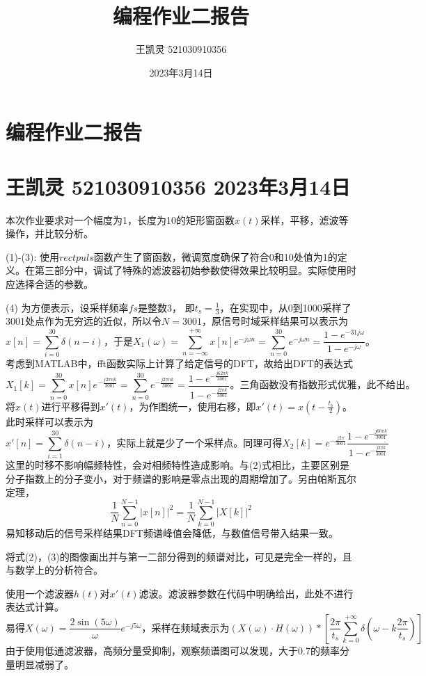 \documentclass[a4paper]{article}
\title{编程作业二报告}
\author{王凯灵 521030910356}
\date{2023年3月14日}
\begin{document}
	\section*{\Huge 编程作业二报告}
	\section*{\small 王凯灵 521030910356 2023年3月14日}
	本次作业要求对一个幅度为1，长度为10的矩形窗函数$x(t)$采样，平移，滤波等操作，并比较分析。
	
	(1)-(3): 使用$rectpuls$函数产生了窗函数，微调宽度确保了符合0和10处值为1的定义。在第三部分中，调试了特殊的滤波器初始参数使得效果比较明显。实际使用时应选择合适的参数。
	
	(4) 为方便表示，设采样频率$fs$是整数3， 即$t_s=\frac{1}{3}$，在实现中，从0到1000采样了3001处点作为无穷远的近似，所以令$N=3001$，原信号时域采样结果可以表示为
	\begin{equation}
	x[n] = \sum_{i=0}^{30}\delta(n-i)\text{，于是}
	X_1(\omega)=\sum_{n=-\infty}^{+\infty} x[n] e^{-j \omega n}=\sum_{n=0}^{30} e^{-j \omega n}=\frac{1-e^{-31 j \omega}}{1-e^{-j \omega}}\text{。}
	\end{equation}
	考虑到MATLAB中，fft函数实际上计算了给定信号的DFT，故给出DFT的表达式
	\begin{equation}
	X_1[k] = \sum_{n=0}^{30}x[n]e^{-\frac{j2\pi n k}{3001}}=\sum_{n=0}^{30} e^{-\frac{j2\pi n k}{3001}} = \frac{1-e^{-\frac{j 62\pi k}{3001}}}{1-e^{-\frac{j 2\pi k}{3001}}}\text{。三角函数没有指数形式优雅，此不给出。}
	\end{equation}
	将$x(t)$进行平移得到$x'(t)$，为作图统一，使用右移，即$x'(t)=x(t-\frac{t_s}{2})$。此时采样可以表示为
	\begin{equation}
		x'[n] = \sum_{i=1}^{30}\delta(n-i)\text{，实际上就是少了一个采样点。同理可得}X_2[k] = e^{- \frac{j 2\pi}{3001}}\frac{1-e^{-\frac{j 60\pi k}{3001}}}{1-e^{-\frac{j 2\pi k}{3001}}}
	\end{equation}
	这里的时移不影响幅频特性，会对相频特性造成影响。与(2)式相比，主要区别是分子指数上的分子变小，对于频谱的影响是零点出现的周期增加了。另由帕斯瓦尔定理，
	\begin{equation}
		\frac{1}{N}\sum_{n=0}^{N-1}|x[n]|^2=\frac{1}{N}\sum_{k=0}^{N-1}|X[k]|^2
	\end{equation}
	易知移动后的信号采样结果DFT频谱峰值会降低，与数值信号带入结果一致。
	
	将式(2)，(3)的图像画出并与第一二部分得到的频谱对比，可见是完全一样的，且与数学上的分析符合。

	使用一个滤波器$h(t)$对$x'(t)$滤波。滤波器参数在代码中明确给出，此处不进行表达式计算。
	\begin{equation}
		\text{易得}X(\omega) = \frac{2\sin(5\omega)}{\omega}e^{-j5\omega}\text{，采样在频域表示为}(X(\omega)\cdot H(\omega))*\left[\frac{2 \pi}{t_s} \sum_{k=0}^{+\infty} \delta\left(\omega-k \frac{2 \pi}{t_s}\right)\right]
	\end{equation}
	由于使用低通滤波器，高频分量受抑制，观察频谱图可以发现，大于0.7的频率分量明显减弱了。
	\newpage
\end{document}
